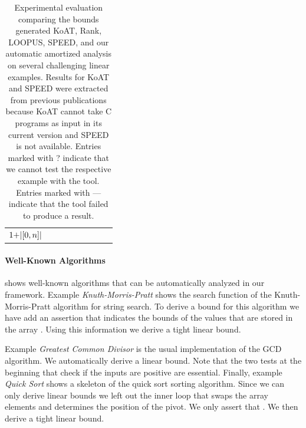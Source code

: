 \documentclass[nocopyrightspace,preprint]{sigplanconf}
\newcommand{\iffull}[2]{\ifx\fullversion\undefined{#2}\else{#1}\fi}
\newcommand{\ifshort}[2]{\ifx\fullversion\undefined{#1}\else{#2}\fi}
\newcommand{\sectskip}[0]{\ifshort{\vspace{-3pt}}{}}
\newcommand{\pref}[1]{\prettyref{#1}}
\begin{document}
{\begin{table}
\begin{tabular}{r|C{1.1cm}c|C{1.8cm}c|C{1.9cm}c|C{1.8cm}|C{2.65cm}}
$1 {+} |[0,n]|$
\\

\end{tabular}
\caption{
  Experimental evaluation comparing the bounds generated KoAT, Rank,
  LOOPUS, SPEED, and our automatic amortized analysis on several
  challenging linear examples. Results for KoAT and SPEED were extracted
  from previous publications because KoAT cannot take C programs as
  input in its current version and SPEED is not available.
  Entries marked with ? indicate that we cannot test the respective example with the tool. Entries
  marked with --- indicate that the tool failed to produce a result.
}
\label{tab:eval}
\end{table}

\paragraph{Well-Known Algorithms}

\pref{fig:cat3} shows well-known algorithms that can be automatically
analyzed in our framework.  Example \emph{Knuth-Morris-Pratt} shows
the search function of the Knuth-Morris-Pratt algorithm for string
search.  To derive a bound for this algorithm we have add an assertion
that indicates the bounds of the values that are stored in the array
.  Using this information we derive a tight linear bound.

Example \emph{Greatest Common Divisor} is the usual implementation of
the GCD algorithm.  We automatically derive a linear bound.  Note that
the two tests at the beginning that check if the inputs are positive
are essential.  Finally, example \emph{Quick Sort} shows a skeleton of
the quick sort sorting algorithm.  Since we can only derive linear
bounds we left out the inner loop that swaps the array elements and
determines the position  of the pivot.  We only assert that
.  We then derive a tight linear bound.

}\fi


\iffull{

}
{
\sectskip
\scriptsize

}
\end{document}
